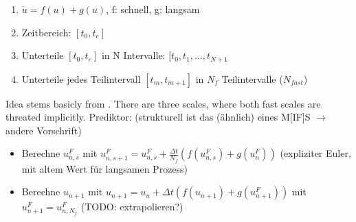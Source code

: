 \documentclass{article}
\begin{document}
 \begin{enumerate}
  \item $\dot u=f(u)+g(u)$, f: schnell, g: langsam
  \item Zeitbereich: $[t_0,t_e]$
  \item Unterteile $[t_0,t_e]$ in N Intervalle: $[t_0,t_1,\dots,t_{N+1}$
  \item Unterteile jedes Teilintervall $[t_m,t_{m+1}]$ in $N_f$ Teilintervalle ($N_{fast}$)
 \end{enumerate}
 Idea stems basicly from \cite{bourlioux2003high}. There are three scales, where both fast scales are threated implicitly.
 Prediktor: (strukturell ist das (ähnlich) eines M[IF]S $\rightarrow$ andere Vorschrift)
 \begin{itemize}
  \item Berechne $u_{n,s}^F$ mit $u_{n,s+1}^F=u_{n,s}^F+\frac{\Delta t}{N_f} (f(u_{n,s}^F)+g(u_n^F))$ (expliziter Euler, mit altem Wert für langsamen Prozess)
  \item Berechne $u_{n+1}$ mit $u_{n+1}=u_{n}+\Delta t(f(u_{n+1})+g(u_{n+1}^F))$ mit $u_{n+1}^F=u_{n,N_{f}}^F$ (TODO: extrapolieren?)
 \end{itemize}
\end{document}
